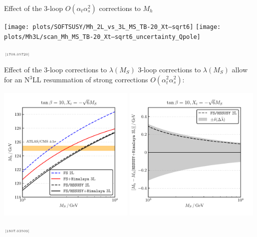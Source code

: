 \documentclass[hyperref={pdfpagelabels=false},ngerman]{beamer}
\newcommand{\MS}{\ensuremath{M_S}}
\newcommand{\mycite}[1]{\ensuremath{\text{\textcolor{darkgray}{\tiny [#1]}}}}
\newcommand{\at}{\alpha_t}
\newcommand{\as}{\alpha_s}
\begin{document}

\begin{frame}[noframenumbering]{Effect of the 3-loop $O(\at\as^2)$ corrections to $M_h$}
  \begin{center}
    \texttt{[image: plots/SOFTSUSY/Mh\_2L\_vs\_3L\_MS\_TB-20\_Xt--sqrt6]}\hfill
    \texttt{[image: plots/Mh3L/scan\_Mh\_MS\_TB-20\_Xt--sqrt6\_uncertainty\_Qpole]}
  \end{center}
  \mycite{1708.05720}
\end{frame}


\begin{frame}[noframenumbering]{Effect of the 3-loop corrections to $\lambda(\MS)$}
  3-loop corrections to $\lambda(\MS)$ allow for an N$^3$LL
  resummation of strong corrections $O(\at^2\as^2)$:
  \begin{center}
    \includegraphics[width=0.49\textwidth]{plots/HSSUSY-3L/scan_Mh_MS_TB-10_Xt--sqrt6}\hfill
    \includegraphics[width=0.49\textwidth]{plots/HSSUSY-3L/scan_Mh_MS_TB-10_Xt--sqrt6_diff}
  \end{center}
  \mycite{1807.03509}
\end{frame}
\end{document}
